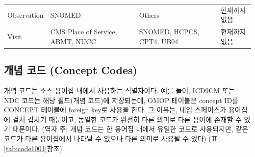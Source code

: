 \documentclass[11pt]{book}
\theoremstyle{definition}
\theoremstyle{definition}
\theoremstyle{definition}
\theoremstyle{remark}
\begin{document}
\begin{longtable}[]{@{}llll@{}}
\begin{minipage}[t]{0.12\columnwidth}\raggedright\strut
Observation\strut
\end{minipage} & \begin{minipage}[t]{0.21\columnwidth}\raggedright\strut
SNOMED\strut
\end{minipage} & \begin{minipage}[t]{0.21\columnwidth}\raggedright\strut
Others\strut
\end{minipage} & \begin{minipage}[t]{0.18\columnwidth}\raggedright\strut
현재까지 없음\strut
\end{minipage}\tabularnewline
\begin{minipage}[t]{0.12\columnwidth}\raggedright\strut
Visit\strut
\end{minipage} & \begin{minipage}[t]{0.21\columnwidth}\raggedright\strut
CMS Place of Service, ABMT, NUCC\strut
\end{minipage} & \begin{minipage}[t]{0.21\columnwidth}\raggedright\strut
SNOMED, HCPCS, CPT4, UB04\strut
\end{minipage} & \begin{minipage}[t]{0.18\columnwidth}\raggedright\strut
현재까지 없음\strut
\end{minipage}\tabularnewline
\bottomrule
\end{longtable}

\subsection{개념 코드 (Concept Codes)}\label{--concept-codes}

개념 코드는 소스 용어집 내에서 사용하는 식별자이다. 예를 들어, ICD9CM
또는 NDC 코드는 해당 필드(개념 코드)에 저장되는데, OMOP 테이블은 concept
ID를 CONCEPT 테이블에 foreign key로 사용을 한다. 그 이유는, 네임
스페이스가 용어집에 걸쳐 겹치기 때문이고, 동일한 코드가 완전히 다른
의미로 다른 용어에 존재할 수 있기 때문이다. (역자 주: 개념 코드는 한
용어집 내에서 유일한 코드로 사용되지만, 같은 코드가 다른 용어집에서
나타날 수 있으나 다른 의미로 사용될 수 있다) (표 \ref{tab:code1001}참조)
\end{document}
